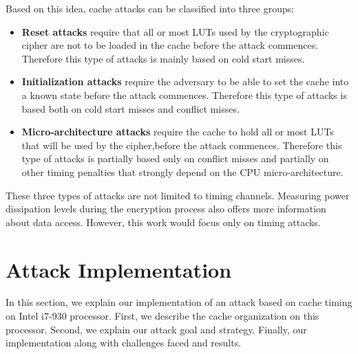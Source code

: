 \documentclass[twocolumn]{IEEEtran}
\begin{document}
Based on this idea, cache attacks can be classified into three groups:

\begin {itemize}

\item \textbf{Reset attacks} require that all or most LUTs used by the cryptographic cipher are not to be loaded in the cache before the attack commences. Therefore this type of attacks is mainly based on cold start misses.

\item \textbf{Initialization attacks} require the adversary to be able to set the cache into a known state before the attack commences. Therefore this type of attacks is based both on cold start misses and conflict misses.

\item \textbf{Micro-architecture attacks} require the cache to hold all or most LUTs that will be used by the cipher,before the attack commences. Therefore this type of attacks is partially based only on conflict misses and partially on other timing penalties that
strongly depend on the CPU micro-architecture. 

\end {itemize}

These three types of attacks are not limited to timing channels. Measuring power dissipation levels during the encryption process also offers more information about data access. However, this work would focus only on timing attacks.

\section {Attack Implementation}
In this section, we explain our implementation of an attack based on cache timing on Intel i7-930 processor. First, we describe the cache organization on this processor. Second, we explain our attack goal and strategy. Finally, our implementation along with challenges faced and results.
\end{document}
